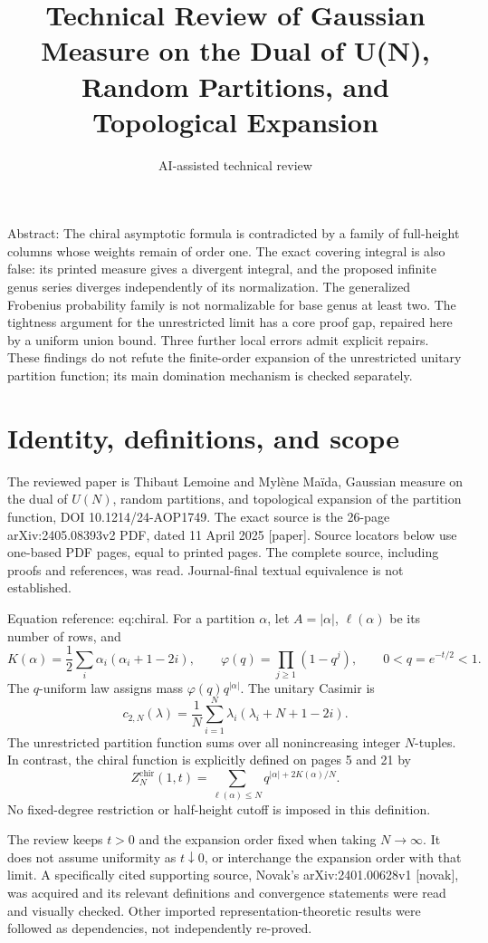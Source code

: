 \documentclass[10pt]{article}
\title{Technical Review of Gaussian Measure on the Dual of U(N), Random Partitions, and Topological Expansion}
\author{AI-assisted technical review}
\date{}
\begin{document}
\maketitle
Abstract: The chiral asymptotic formula is contradicted by a family of full-height columns whose weights remain of order one. The exact covering integral is also false: its printed measure gives a divergent integral, and the proposed infinite genus series diverges independently of its normalization. The generalized Frobenius probability family is not normalizable for base genus at least two. The tightness argument for the unrestricted limit has a core proof gap, repaired here by a uniform union bound. Three further local errors admit explicit repairs. These findings do not refute the finite-order expansion of the unrestricted unitary partition function; its main domination mechanism is checked separately.\par
\section*{Identity, definitions, and scope}
The reviewed paper is Thibaut Lemoine and Mylène Maïda, Gaussian measure on the dual of \(U(N)\), random partitions, and topological expansion of the partition function, DOI 10.1214/24-AOP1749. The exact source is the 26-page arXiv:2405.08393v2 PDF, dated 11 April 2025 [paper]. Source locators below use one-based PDF pages, equal to printed pages. The complete source, including proofs and references, was read. Journal-final textual equivalence is not established.\par
Equation reference: eq:chiral. For a partition \(\alpha\), let \(A=|\alpha|\), \(\ell(\alpha)\) be its number of rows, and \[K(\alpha)=\frac12\sum_i\alpha_i(\alpha_i+1-2i),\qquad
\varphi(q)=\prod_{j\geq1}(1-q^j),\qquad 0<q=e^{-t/2}<1.\] The \(q\)-uniform law assigns mass \(\varphi(q)q^{|\alpha|}\). The unitary Casimir is \[c_{2,N}(\lambda)=\frac1N\sum_{i=1}^N\lambda_i(\lambda_i+N+1-2i).\] The unrestricted partition function sums over all nonincreasing integer \(N\)-tuples. In contrast, the chiral function is explicitly defined on pages 5 and 21 by \[
Z_N^{\mathrm{chir}}(1,t)=
\sum_{\ell(\alpha)\leq N}q^{|\alpha|+2K(\alpha)/N}.\] No fixed-degree restriction or half-height cutoff is imposed in this definition.\par
The review keeps \(t>0\) and the expansion order fixed when taking \(N\to\infty\). It does not assume uniformity as \(t\downarrow0\), or interchange the expansion order with that limit. A specifically cited supporting source, Novak’s arXiv:2401.00628v1 [novak], was acquired and its relevant definitions and convergence statements were read and visually checked. Other imported representation-theoretic results were followed as dependencies, not independently re-proved.\par
\end{document}
